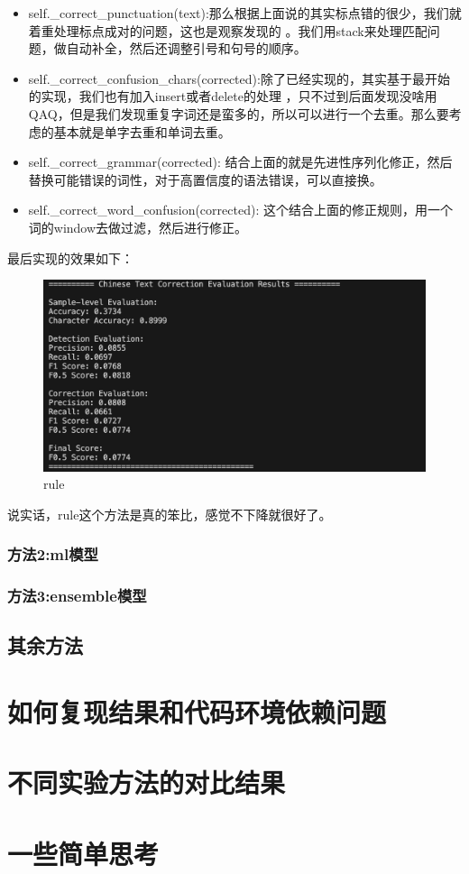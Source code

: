 \documentclass[answers]{exam}  %
\begin{document}
\begin{itemize}
    \item self.\_correct\_punctuation(text):那么根据上面说的其实标点错的很少，我们就着重处理标点成对的问题，这也是观察发现的
    。我们用stack来处理匹配问题，做自动补全，然后还调整引号和句号的顺序。
    \item self.\_correct\_confusion\_chars(corrected):除了已经实现的，其实基于最开始的实现，我们也有加入insert或者delete的处理
    ，只不过到后面发现没啥用QAQ，但是我们发现重复字词还是蛮多的，所以可以进行一个去重。那么要考虑的基本就是单字去重和单词去重。
    \item self.\_correct\_grammar(corrected): 结合上面的就是先进性序列化修正，然后替换可能错误的词性，对于高置信度的语法错误，可以直接换。
    \item self.\_correct\_word\_confusion(corrected): 这个结合上面的修正规则，用一个词的window去做过滤，然后进行修正。
\end{itemize}
最后实现的效果如下：\\
\begin{figure}[h]
    \centering
    \label{rule}
    \includegraphics[width=1\textwidth]{../pic/rule.png} 
    \caption{rule}  
\end{figure}

说实话，rule这个方法是真的笨比，感觉不下降就很好了。

\subsubsection{方法2:ml模型}

\subsubsection{方法3:ensemble模型}

\subsection{其余方法}

\section{如何复现结果和代码环境依赖问题}

\section{不同实验方法的对比结果}

\section{一些简单思考}
\end{document}
